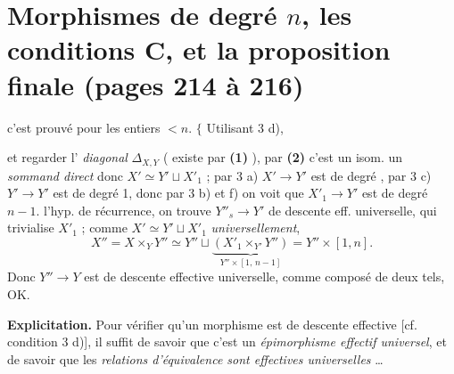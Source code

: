 \documentclass[11pt,a4paper]{article}
\begin{document}

\section*{Morphismes de degré $n$, les conditions C, et la proposition finale (pages 214 à 216)}


c'est prouvé pour les entiers $< n$. $\{$ Utilisant 3 d),


et regarder l' \emph{diagonal} $\Delta_{X,Y}$ ( existe
par \textbf{(1)} ), par \textbf{(2)} c'est un isom.  un \emph{sommand direct}
 donc $X' \simeq Y' \sqcup X'_1$ ; par 3 a)
$X' \longrightarrow Y'$ est de degré  \struck{\ill{}}, par 3 c)
 
$Y' \longrightarrow Y'$ est de degré 1, donc par 3 b) et f) on
voit que $X'_1 \longrightarrow Y'$ est de degré $n-1$. 
l'hyp. de récurrence, on trouve $Y''_s \longrightarrow Y'$ 
de descente eff. universelle, qui trivialise $X'_1$ ; comme
$X' \simeq Y' \sqcup X'_1$ \emph{universellement},
\[
  X'' = X \times_Y Y'' \simeq Y'' \sqcup
  \underbrace{(X'_1 \times_{Y'} Y'')}_{Y'' \times [1,\, n-1]}
  = Y'' \times [1, n] .
\]
Donc $Y'' \longrightarrow Y$ est de descente effective universelle, comme
composé de deux tels, OK.

\textbf{Explicitation.} Pour vérifier qu'un  morphisme
est de descente effective [cf. condition 3 d)], il suffit de savoir que
c'est un \emph{épimorphisme effectif universel}, et de savoir que les
\emph{relations d'équivalence sont effectives universelles} \ldots

\end{document}
